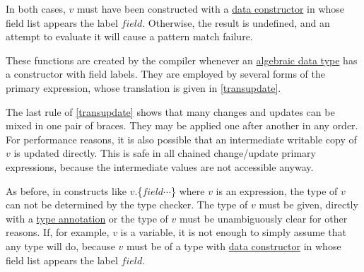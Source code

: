 In both cases, $v$ must have been constructed with a \hyperref[fieldconstructor]{data constructor} in whose field list appears the label $field$. Otherwise, the result is undefined, and an attempt to evaluate it will cause a pattern match failure.

These functions are created by the compiler whenever an \hyperref[algdcl]{algebraic data type} has a constructor with field labels. They are employed by several forms of the primary expression, whose translation is given in \autoref{transupdate}.

The last rule of  \autoref{transupdate} shows that many changes and updates can be mixed in one pair of braces. They may be applied one after another in any order. For performance reasons, it is also possible that an intermediate writable copy of $v$ is updated directly. This is safe in all chained change/update primary expressions, because the intermediate values are not accessible anyway.

As before, in constructs like $v$.\{$field \cdots$\} where $v$ is an expression, the type of $v$ can not be determined by the type checker. The type of $v$ must be given, directly with a \hyperref[annotation]{type annotation} or the type of $v$ must be unambiguously clear for other reasons. If, for example, $v$ is a variable, it is not enough to simply assume that any type will do, because $v$ must be of a type with \hyperref[fieldconstructor]{data constructor} in whose field list appears the label $field$. 



